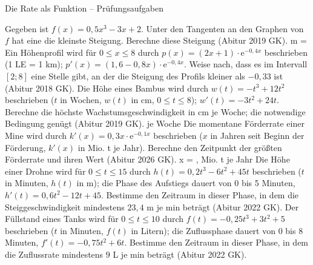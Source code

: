 \begin{aufgabe}{Die Rate als Funktion – Prüfungsaufgaben}
\begin{teile}
\teil Gegeben ist $f(x) = 0{,}5x^3 - 3x + 2$. Unter den Tangenten an den Graphen von $f$ hat eine die kleinste Steigung. Berechne diese Steigung \hfill (Abitur 2019 GK). m = \leerfeld
\teil Ein Höhenprofil wird für $0 \le x \le 8$ durch $p(x) = (2x + 1) \cdot \mathrm{e}^{-0{,}4x}$ beschrieben (1 LE = 1 km); $p'(x) = (1{,}6 - 0{,}8x) \cdot \mathrm{e}^{-0{,}4x}$. Weise nach, dass es im Intervall $[2; 8]$ eine Stelle gibt, an der die Steigung des Profils kleiner als $-0{,}33$ ist \hfill (Abitur 2018 GK).
\teil Die Höhe eines Bambus wird durch $w(t) = -t^3 + 12t^2$ beschrieben ($t$ in Wochen, $w(t)$ in cm, $0 \le t \le 8$); $w'(t) = -3t^2 + 24t$. Berechne die höchste Wachstumsgeschwindigkeit in cm je Woche; die notwendige Bedingung genügt \hfill (Abitur 2019 GK). \leerfeld[cm] je Woche
\teil Die momentane Förderrate einer Mine wird durch $k'(x) = 0{,}3x \cdot \mathrm{e}^{-0{,}1x}$ beschrieben ($x$ in Jahren seit Beginn der Förderung, $k'(x)$ in Mio. t je Jahr). Berechne den Zeitpunkt der größten Förderrate und ihren Wert \hfill (Abitur 2026 GK). x = \leerfeld , \leerfeld Mio. t je Jahr
\teil Die Höhe einer Drohne wird für $0 \le t \le 15$ durch $h(t) = 0{,}2t^3 - 6t^2 + 45t$ beschrieben ($t$ in Minuten, $h(t)$ in m); die Phase des Aufstiegs dauert von 0 bis 5 Minuten, $h'(t) = 0{,}6t^2 - 12t + 45$. Bestimme den Zeitraum in dieser Phase, in dem die Steiggeschwindigkeit mindestens $23{,}4$ m je min beträgt \hfill (Abitur 2022 GK).
\teil Der Füllstand eines Tanks wird für $0 \le t \le 10$ durch $f(t) = -0{,}25t^3 + 3t^2 + 5$ beschrieben ($t$ in Minuten, $f(t)$ in Litern); die Zuflussphase dauert von 0 bis 8 Minuten, $f'(t) = -0{,}75t^2 + 6t$. Bestimme den Zeitraum in dieser Phase, in dem die Zuflussrate mindestens $9$ L je min beträgt \hfill (Abitur 2022 GK).
\end{teile}
\end{aufgabe}

